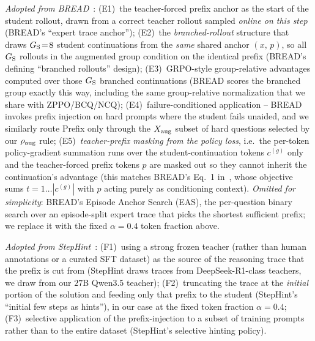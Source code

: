 \documentclass{llmxive}
\begin{document}
\emph{Adopted from BREAD}~\citep{zhang2025bread}: (E1)~the teacher-forced prefix anchor as the start of the student rollout, drawn from a correct teacher rollout sampled \emph{online on this step} (BREAD's ``expert trace anchor''); (E2)~the \emph{branched-rollout} structure that draws $G_{\rm S}\!=\!8$ student continuations from the \emph{same} shared anchor $(x,\,p)$, so all $G_{\rm S}$ rollouts in the augmented group condition on the identical prefix (BREAD's defining ``branched rollouts'' design); (E3)~GRPO-style group-relative advantages computed over those $G_{\rm S}$ branched continuations (BREAD scores the branched group exactly this way, including the same group-relative normalization that we share with ZPPO/BCQ/NCQ); (E4)~failure-conditioned application -- BREAD invokes prefix injection on hard prompts where the student fails unaided, and we similarly route Prefix only through the $X_{\rm aug}$ subset of hard questions selected by our $\rho_{\rm aug}$ rule; (E5)~\emph{teacher-prefix masking from the policy loss}, i.e.\ the per-token policy-gradient summation runs over the student-continuation tokens $c^{(g)}$ only and the teacher-forced prefix tokens $p$ are masked out so they cannot inherit the continuation's advantage (this matches BREAD's Eq.~1 in~\citep{zhang2025bread}, whose objective sums $t\!=\!1\ldots|c^{(g)}|$ with $p$ acting purely as conditioning context). \emph{Omitted for simplicity}: BREAD's Episode Anchor Search (EAS), the per-question binary search over an episode-split expert trace that picks the shortest sufficient prefix; we replace it with the fixed $\alpha\!=\!0.4$ token fraction above.

\emph{Adopted from StepHint}~\citep{zhang2025stephint}: (F1)~using a strong frozen teacher (rather than human annotations or a curated SFT dataset) as the source of the reasoning trace that the prefix is cut from (StepHint draws traces from DeepSeek-R1-class teachers, we draw from our $27$B Qwen3.5 teacher); (F2)~truncating the trace at the \emph{initial} portion of the solution and feeding only that prefix to the student (StepHint's ``initial few steps as hints''), in our case at the fixed token fraction $\alpha\!=\!0.4$; (F3)~selective application of the prefix-injection to a subset of training prompts rather than to the entire dataset (StepHint's selective hinting policy).
\end{document}
